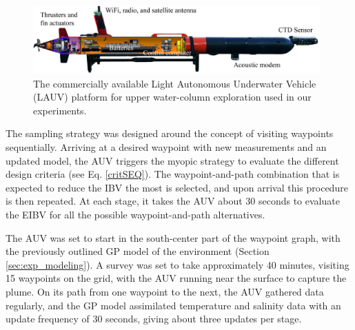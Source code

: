 \documentclass[aoas]{imsart}
\begin{document}
\begin{figure}[!h] 
\centering 
\includegraphics[width=0.98\textwidth]{Figures/harald.jpg}
\caption{The commercially available Light Autonomous Underwater
  Vehicle (LAUV) platform for upper water-column exploration used in
  our experiments.}
\label{fig:lauv}
\end{figure} 

The sampling strategy was designed around the concept of visiting
waypoints sequentially. Arriving at a desired waypoint with new
measurements and an updated model, the AUV triggers the myopic
strategy to evaluate the different design criteria (see
Eq. \eqref{critSEQ}). The waypoint-and-path combination that is
expected to reduce the IBV the most is selected, and upon arrival this
procedure is then repeated. At each stage, it takes the AUV about 30
seconds to evaluate the EIBV for all the possible
waypoint-and-path alternatives.

The AUV was set to start in the south-center part of the waypoint
graph, with the previously outlined GP model of the environment (Section \ref{sec:exp_modeling}). A
survey was set to take approximately 40 minutes, visiting 15 waypoints
on the grid, with the AUV running near the surface to capture the
plume. On its path from one waypoint to the next, the AUV gathered
data regularly, and the GP model assimilated temperature and salinity
data with an update frequency of 30 seconds, giving about three updates
per stage.
\end{document}
